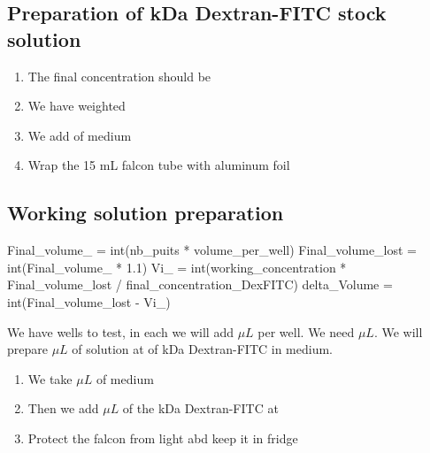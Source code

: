 \subsection{ Preparation of  kDa Dextran-FITC stock solution}

\begin{enumerate}
\item The final concentration should be  
\item We have weighted   
\item We add   of medium
\item Wrap the 15 mL falcon tube with aluminum foil
\end{enumerate}

\subsection{Working solution preparation}

\begin{pycode}

Final_volume_ = int(nb_puits * volume_per_well)
Final_volume_lost = int(Final_volume_ * 1.1)
Vi_ = int(working_concentration * Final_volume_lost / final_concentration_DexFITC)
delta_Volume = int(Final_volume_lost - Vi_)    
\end{pycode}

We have  wells to test, in each we will add  $\mu L$ per well. We need  $\mu L$. We will prepare  $\mu L$ of solution at   of  kDa Dextran-FITC in medium. 

\begin{enumerate}
\item We take  $\mu L$ of medium
\item Then we add  $\mu L$ of the  kDa Dextran-FITC at  
\item Protect the falcon from light abd keep it in fridge
\end{enumerate}